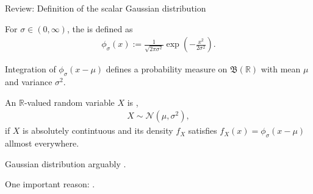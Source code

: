 \begin{frame}{Review: Definition of the scalar Gaussian distribution}
\bit
\item For $\sigma\in(0,\infty)$, the  is defined as 
\begin{align*}
\phi_{\sigma}(x):=\frac{1}{\sqrt{2\pi\sigma^2}}\exp\left(-\frac{x^2}{2\sigma^2}\right).
\end{align*}
\item Integration of $\phi_{\sigma}(x-\mu)$ defines a probability measure on $\mathfrak{B}(\mathbb{R})$ with mean $\mu$ and variance $\sigma^2$. 
\eit

\bit
\item An $\mathbb{R}$-valued random variable $X$ is , 
\begin{align*}
X\sim \mathcal{N}(\mu,\sigma^2), 
\end{align*}
if 
$X$ is absolutely contintuous and its density $f_X$ satisfies $f_X(x)=\phi_{\sigma}(x-\mu)$ allmost everywhere. 
\item Gaussian distribution arguably . 
\item One important  reason: . 
\eit
\end{frame}









